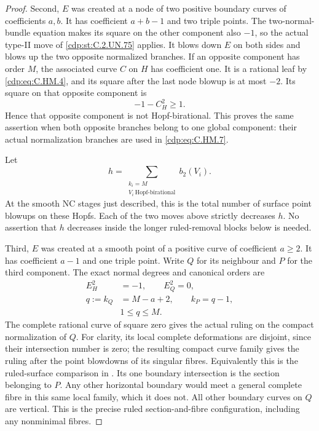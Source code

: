 \begin{proof}
Second, \(E\) was created at a node of two positive
boundary curves of coefficients \(a,b\).  It has
coefficient \(a+b-1\) and two triple points.  The
two-normal-bundle equation makes its square on the
other component also \(-1\), so the actual type-II
move of \ref{cdp:st:C.2.UN.75} applies.  It blows down \(E\) on both
sides and blows up the two opposite normalized
branches.  If an opposite component has order \(M\),
the associated curve \(C\) on \(H\) has coefficient
one.  It is a rational leaf by \eqref{cdp:eq:C.HM.4}, and its
square after the last node blowup is at most \(-2\).
Its square on that opposite component is
\[
                 -1-C_H^2\ge1 .
\tag{C.HM.7}\label{cdp:eq:C.HM.7}
\]
Hence that opposite component is not Hopf-birational.
This proves the same assertion when both opposite
branches belong to one global component: their actual
normalization branches are used in \eqref{cdp:eq:C.HM.7}.

Let
\[
       h=\sum_{\substack{k_i=M\\
                     V_i\ \mathrm{Hopf\text{-}birational}}}
                              b_2(V_i).
\tag{C.HM.8}\label{cdp:eq:C.HM.8}
\]
At the smooth NC stages just described, this is the
total number of surface point blowups on these Hopfs.
Each of the two moves above strictly decreases \(h\).
No assertion that \(h\) decreases inside the longer
ruled-removal blocks below is needed.

Third, \(E\) was created at a smooth point of a
positive curve of coefficient \(a\ge2\).  It has
coefficient \(a-1\) and one triple point.  Write \(Q\)
for its neighbour and \(P\) for the third component.
The exact normal degrees and canonical orders are
\[
 \begin{split}
 E_H^2&=-1,\qquad E_Q^2=0,\\
 q:=k_Q&=M-a+2,\qquad k_P=q-1,\\
                         &1\le q\le M .
 \end{split}
\tag{C.HM.9}\label{cdp:eq:C.HM.9}
\]
The complete rational curve of square zero gives
the actual ruling on the compact normalization of
\(Q\).  For clarity, its local complete deformations
are disjoint, since their intersection number is zero;
the resulting compact curve family gives the ruling
after the point blowdowns of its singular fibres.
Equivalently this is the ruled-surface comparison in
\cite[\S4.5]{Kulikov1977}.  Its one boundary intersection
is the section belonging to \(P\).  Any other
horizontal boundary would meet a general complete
fibre in this same local family, which it does not.
All other boundary curves on \(Q\) are vertical.
This is the precise ruled section-and-fibre
configuration, including any nonminimal fibres.


\end{proof}
